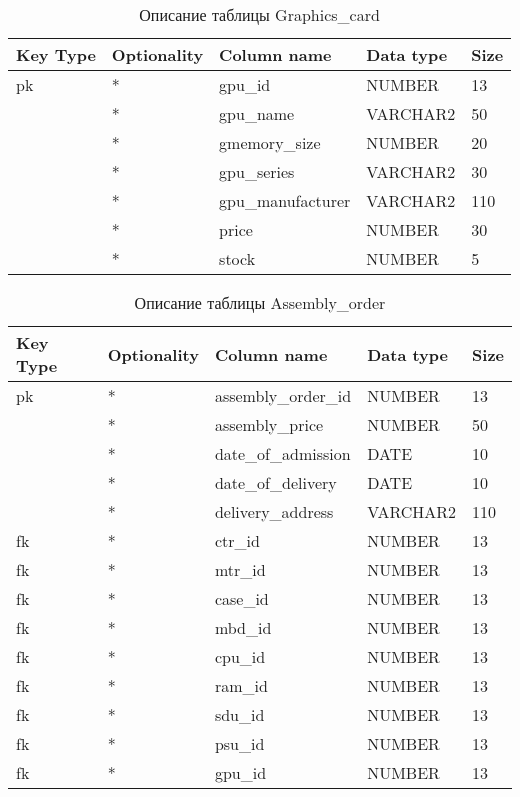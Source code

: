 \begin{xltabular}{\textwidth}{|X|X|p{4.0cm}|X|X|}
	\caption{Описание таблицы Graphics\_card\label{tab:gpu}}\\
	\hline
	Key Type & Optionality & Column name & Data type & Size \\ \hline
	pk & * & gpu\_id & NUMBER & 13 \\ \hline
	& * & gpu\_name & VARCHAR2 & 50 \\ \hline
	& * & gmemory\_size & NUMBER & 20 \\ \hline
	& * & gpu\_series & VARCHAR2 & 30 \\ \hline
	& * & gpu\_manufacturer & VARCHAR2 & 110 \\ \hline
	& * & price & NUMBER & 30 \\ \hline
	& * & stock & NUMBER & 5 \\ \hline
\end{xltabular}

\begin{xltabular}{\textwidth}{|X|X|p{4.0cm}|X|X|}
	\caption{Описание таблицы Assembly\_order\label{tab:aso}}\\
	\hline
	Key Type & Optionality & Column name & Data type & Size \\ \hline
	pk & * & assembly\_order\_id & NUMBER & 13 \\ \hline
	& * & assembly\_price & NUMBER & 50 \\ \hline
	& * & date\_of\_admission & DATE & 10 \\ \hline
	& * & date\_of\_delivery & DATE & 10 \\ \hline
	& * & delivery\_address & VARCHAR2 & 110 \\ \hline
	fk & * & ctr\_id & NUMBER & 13 \\ \hline
	fk & * & mtr\_id & NUMBER & 13 \\ \hline
	fk & * & case\_id & NUMBER & 13 \\ \hline
	fk & * & mbd\_id & NUMBER & 13 \\ \hline
	fk & * & cpu\_id & NUMBER & 13 \\ \hline
	fk & * & ram\_id & NUMBER & 13 \\ \hline
	fk & * & sdu\_id & NUMBER & 13 \\ \hline
	fk & * & psu\_id & NUMBER & 13 \\ \hline
	fk & * & gpu\_id & NUMBER & 13 \\ \hline
\end{xltabular}

